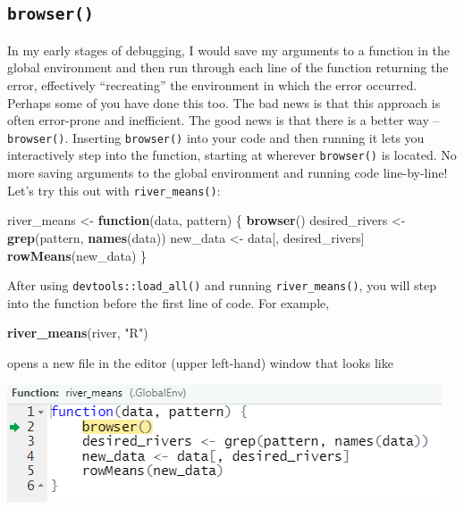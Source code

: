 \documentclass[
]{book}
\newenvironment{Shaded}{\begin{snugshade}}{\end{snugshade}}
\newcommand{\ControlFlowTok}[1]{\textcolor[rgb]{0.13,0.29,0.53}{\textbf{#1}}}
\newcommand{\KeywordTok}[1]{\textcolor[rgb]{0.13,0.29,0.53}{\textbf{#1}}}
\newcommand{\NormalTok}[1]{#1}
\newcommand{\StringTok}[1]{\textcolor[rgb]{0.31,0.60,0.02}{#1}}
\begin{document}
\hypertarget{browser}{%
\subsection{\texorpdfstring{\texttt{browser()}}{browser()}}\label{browser}}

In my early stages of debugging, I would save my arguments to a function in the global environment and then run through each line of the function returning the error, effectively ``recreating'' the environment in which the error occurred. Perhaps some of you have done this too. The bad news is that this approach is often error-prone and inefficient. The good news is that there is a better way -- \texttt{browser()}. Inserting \texttt{browser()} into your code and then running it lets you interactively step into the function, starting at wherever \texttt{browser()} is located. No more saving arguments to the global environment and running code line-by-line! Let's try this out with \texttt{river\_means()}:

\begin{Shaded}
\begin{Highlighting}[]
\NormalTok{river_means <-}\StringTok{ }\ControlFlowTok{function}\NormalTok{(data, pattern) \{}
  \KeywordTok{browser}\NormalTok{()}
\NormalTok{  desired_rivers <-}\StringTok{ }\KeywordTok{grep}\NormalTok{(pattern, }\KeywordTok{names}\NormalTok{(data))}
\NormalTok{  new_data <-}\StringTok{ }\NormalTok{data[, desired_rivers]}
  \KeywordTok{rowMeans}\NormalTok{(new_data)}
\NormalTok{\}}
\end{Highlighting}
\end{Shaded}

After using \texttt{devtools::load\_all()} and running \texttt{river\_means()}, you will step into the function before the first line of code. For example,

\begin{Shaded}
\begin{Highlighting}[]
\KeywordTok{river_means}\NormalTok{(river, }\StringTok{"R"}\NormalTok{)}
\end{Highlighting}
\end{Shaded}

opens a new file in the editor (upper left-hand) window that looks like

\includegraphics[width=0.75\linewidth]{images/newrpack_files7}
\end{document}

